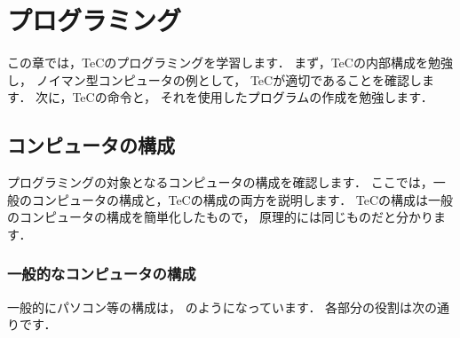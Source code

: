\renewcommand{\myepsfbox}[1]{\epsfbox{chap5/#1}}

\chapter{プログラミング}

この章では，TeCのプログラミングを学習します．
まず，TeCの内部構成を勉強し，
ノイマン型コンピュータの例として，
TeCが適切であることを確認します．
次に，TeCの命令と，
それを使用したプログラムの作成を勉強します．

\section{コンピュータの構成}

プログラミングの対象となるコンピュータの構成を確認します．
ここでは，一般のコンピュータの構成と，TeCの構成の両方を説明します．
TeCの構成は一般のコンピュータの構成を簡単化したもので，
原理的には同じものだと分かります．

\subsection{一般的なコンピュータの構成}


一般的にパソコン等の構成は，
のようになっています．
各部分の役割は次の通りです．

